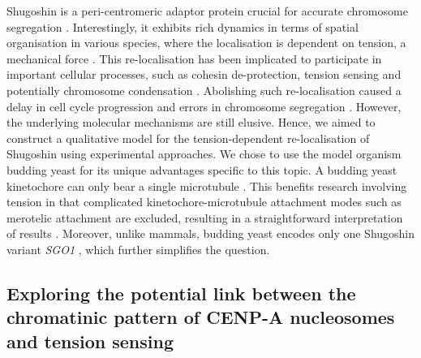 Shugoshin is a peri-centromeric adaptor protein crucial for accurate chromosome segregation \citep{Marston2015, Zhang2020FunctioningMitosis}. Interestingly, it exhibits rich dynamics in terms of spatial organisation in various species, where the localisation is dependent on tension, a mechanical force \citep{Huang2007, Lee2008, Liu2013, Asai2020, Lee2008, Gomez2007, Eshleman2014, Nerusheva2014, Paldi2020ConvergentPericentromeres, Clarke2005, Kawashima2007}. This re-localisation has been implicated to participate in important cellular processes, such as cohesin de-protection, tension sensing and potentially chromosome condensation \citep{Indjeian2005a, Nerusheva2014, Su2021SumoylationAnaphase, Lee2008, Liu2013, Leonard2015, Kruitwagen2018}. Abolishing such re-localisation caused a delay in cell cycle progression and errors in chromosome segregation \citep{Su2021SumoylationAnaphase, Liu2013}. However, the underlying molecular mechanisms are still elusive. Hence, we aimed to construct a qualitative model for the tension-dependent re-localisation of Shugoshin using experimental approaches. We chose to use the model organism budding yeast for its unique advantages specific to this topic. A budding yeast kinetochore can only bear a single microtubule \citep{Biggins2013TheKinetochore}. This benefits research involving tension in that complicated kinetochore-microtubule attachment modes such as merotelic attachment are excluded, resulting in a straightforward interpretation of results \citep{Tanaka2010Kinetochore-microtubuleBi-orientation}. Moreover, unlike mammals, budding yeast encodes only one Shugoshin variant \textit{SGO1} \citep{Marston2015}, which further simplifies the question. 

\subsection{Exploring the potential link between the chromatinic pattern of CENP-A nucleosomes and tension sensing}

